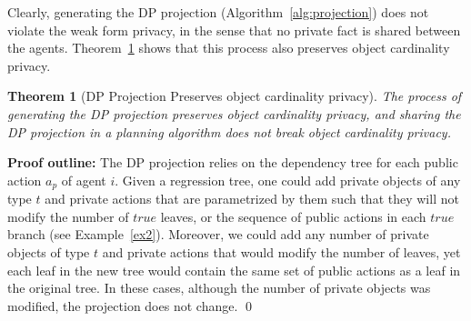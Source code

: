 \documentclass[letterpaper]{article}
\newcommand{\true}{\textit{true}}
\newtheorem{theorem}{Theorem}
\newcommand\cprivacy{object cardinality privacy}
\theoremstyle{definition}
\begin{document}
Clearly, generating the DP projection (Algorithm~\ref{alg:projection}) does not violate the weak form privacy, in the sense that no private fact is shared between the agents. Theorem~\ref{the:dp-proof} shows that this process also preserves \cprivacy .
\begin{theorem}[DP Projection Preserves \cprivacy ]
The process of generating the DP projection preserves \cprivacy, 
and sharing the DP projection in a planning algorithm does not break \cprivacy .
\label{the:dp-proof}
\end{theorem}
{\bf Proof outline:}
The DP projection relies on the dependency tree for each public action $a_p$ of agent $i$. Given a regression tree, one could add private objects of any type $t$ and private actions that are parametrized by them such that they will not modify the number of $\true$ leaves, or the sequence of public actions in each $\true$ branch (see Example~\ref{ex2}).
Moreover, we could add any number of private objects of type $t$ and private actions that would modify the number of leaves, yet each leaf in the new tree would contain the same set of public actions as a leaf in the original tree. In these cases, although the number of private objects was modified, the projection  does not change. \qed
















\end{document}
